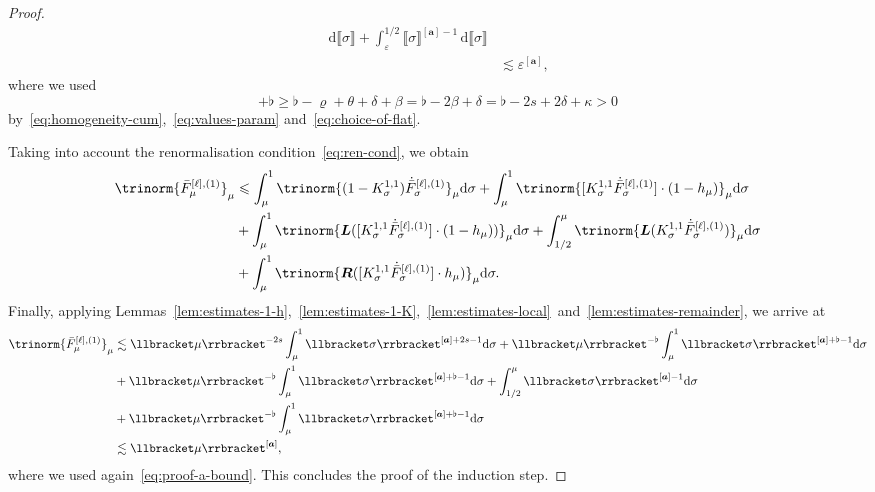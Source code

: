 \documentclass{article}
\numberwithin{equation}{section}
\newcommand{\mathd}{\mathrm{d}}
\theoremstyle{plain}
\theoremstyle{definition}
\begin{document}
\begin{proof}
\begin{align*}
    \,\mathd\llbracket\sigma\rrbracket
    +
    \int_\varepsilon^{1/2}
    \llbracket\sigma\rrbracket^{[\boldsymbol a]-1}
    \,\mathd\llbracket\sigma\rrbracket
    \\
    &\lesssim \varepsilon^{[\boldsymbol a]},
  \end{align*}
  where we used
  \begin{equation}
    [\boldsymbol a]+\flat
    \geqslant
    \flat-\varrho+\theta+\delta+\beta
    =\flat-2\beta+\delta
    =\flat-2s+2\delta+\kappa>0
    \label{eq:proof-a-bound}
  \end{equation}
  by~\eqref{eq:homogeneity-cum},~\eqref{eq:values-param}
  and~\eqref{eq:choice-of-flat}. 
  
  Taking into account the renormalisation
  condition~\eqref{eq:ren-cond}, we obtain
  \[ \begin{aligned}
       \trinorm{ \bar{F}_{\mu}^{[\ell], (1)} }_{\mu} & \leqslant
       \int_{\mu}^1 \trinorm{ (1 - K^{1, 1}_{\sigma})
       \dot{\bar{F}}_{\sigma}^{[\ell], (1)} }_{\mu} \mathd \sigma +
       \int_{\mu}^1 \trinorm{ [K^{1, 1}_{\sigma}
       \dot{\bar{F}}_{\sigma}^{[\ell], (1)}] \cdot (1 - h_{\mu})
       }_{\mu} \mathd \sigma\\
       &   + \int_{\mu}^1 \trinorm{ \boldsymbol{L} ([K^{1, 1}_{\sigma}
       \dot{\bar{F}}_{\sigma}^{[\ell], (1)}] \cdot (1 - h_{\mu}))
       }_{\mu} \mathd \sigma
          + \int_{1 / 2}^{\mu} \trinorm{
       \boldsymbol{L} (K^{1, 1}_{\sigma} \dot{\bar{F}}_{\sigma}^{[\ell], (1)})
       }_{\mu} \mathd \sigma\\
       &   + \int_{\mu}^1 \trinorm{ \boldsymbol{R} ([K^{1, 1}_{\sigma}
       \dot{\bar{F}}_{\sigma}^{[\ell], (1)}] \cdot h_{\mu}) }_{\mu}
       \mathd \sigma .
     \end{aligned} \]
  Finally, applying
  Lemmas~\ref{lem:estimates-1-h},~\ref{lem:estimates-1-K},~\ref{lem:estimates-local}~and~\ref{lem:estimates-remainder},
  we arrive at
  \[ \begin{aligned}
       \trinorm{ \bar{F}_{\mu}^{[\ell], (1)} }_{\mu} & \lesssim
       \llbracket \mu \rrbracket^{- 2 s} \int_{\mu}^1 \llbracket \sigma
       \rrbracket^{[\boldsymbol{a}] + 2 s - 1} \mathd \sigma + \llbracket \mu
       \rrbracket^{- \flat} \int_{\mu}^1 \llbracket \sigma
       \rrbracket^{[\boldsymbol{a}] + \flat - 1} \mathd \sigma\\
       &   + \llbracket \mu \rrbracket^{- \flat} \int_{\mu}^1 \llbracket
       \sigma \rrbracket^{[\boldsymbol{a}] + \flat - 1} \mathd \sigma + \int_{1
       / 2}^{\mu} \llbracket \sigma \rrbracket^{[\boldsymbol{a}] - 1} \mathd
       \sigma\\
       &   + \llbracket \mu \rrbracket^{- \flat} \int_{\mu}^1 \llbracket \sigma
       \rrbracket^{[\boldsymbol{a}] + \flat-1} \mathd \sigma\\
       & \lesssim  \llbracket \mu \rrbracket^{[\boldsymbol{a}]},
     \end{aligned} \]
  where we used again~\eqref{eq:proof-a-bound}. This concludes the proof of
  the induction step.
\end{proof}
\end{document}

